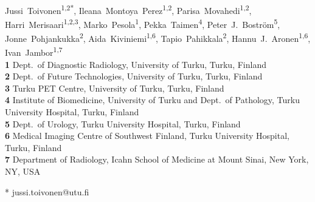 \documentclass[10pt,letterpaper]{article}
\newcommand{\turku}{Turku, Finland}
\newcommand{\utu}{University of Turku}
\newcommand{\tyks}{Turku University Hospital}
\newcommand{\deptdr}{Dept.\ of Diagnostic Radiology}
\newcommand{\deptft}{Dept.\ of Future Technologies}
\begin{document}
\vspace*{0.2in}

\begin{flushleft}
{\Large
\textbf{}
}
\newline
\\
Jussi~Toivonen\textsuperscript{1,2*},
Ileana~Montoya~Perez\textsuperscript{1,2},
Parisa~Movahedi\textsuperscript{1,2},
Harri~Merisaari\textsuperscript{1,2,3},
Marko~Pesola\textsuperscript{1},
Pekka~Taimen\textsuperscript{4},
Peter~J.~Boström\textsuperscript{5},
Jonne~Pohjankukka\textsuperscript{2},
Aida~Kiviniemi\textsuperscript{1,6},
Tapio~Pahikkala\textsuperscript{2},
Hannu~J.~Aronen\textsuperscript{1,6},
Ivan~Jambor\textsuperscript{1,7}
\\
\bigskip
\textbf{1} \deptdr, \utu, \turku\\
\textbf{2} \deptft, \utu, \turku\\
\textbf{3} Turku PET Centre, \utu, \turku\\
\textbf{4} Institute of Biomedicine, \utu{} and
    Dept.\ of Pathology, \tyks, \turku\\
\textbf{5} Dept.\ of Urology, \tyks, \turku\\
\textbf{6} Medical Imaging Centre of Southwest Finland, \tyks, \turku\\
\textbf{7} Department of Radiology, Icahn School of Medicine at Mount Sinai, New
    York, NY, USA\\
\bigskip

%


* jussi.toivonen@utu.fi

\end{flushleft}
\end{document}

